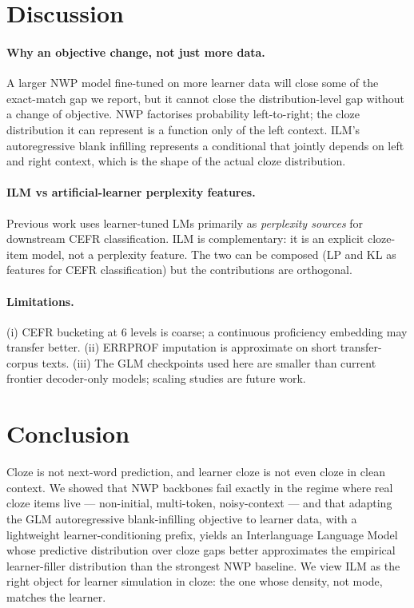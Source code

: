 \documentclass[11pt]{article}
\begin{document}
\section{Discussion}
\label{sec:discussion}

\paragraph{Why an objective change, not just more data.}
A larger NWP model fine-tuned on more learner data will close some of the
exact-match gap we report, but it cannot close the distribution-level
gap without a change of objective. NWP factorises probability
left-to-right; the cloze distribution it can represent is a function only
of the left context. ILM's autoregressive blank infilling represents a
conditional that jointly depends on left and right context, which is the
shape of the actual cloze distribution.

\paragraph{ILM vs artificial-learner perplexity features.}
Previous work uses learner-tuned LMs primarily as \emph{perplexity
sources} for downstream CEFR classification. ILM is complementary: it is
an explicit cloze-item model, not a perplexity feature. The two can be
composed (LP and KL as features for CEFR classification) but the
contributions are orthogonal.

\paragraph{Limitations.}
(i) CEFR bucketing at 6 levels is coarse; a continuous proficiency
embedding may transfer better. (ii) ERRPROF imputation is approximate on
short transfer-corpus texts. (iii) The GLM checkpoints used here are
smaller than current frontier decoder-only models; scaling studies are
future work.

\section{Conclusion}
\label{sec:conclusion}

Cloze is not next-word prediction, and learner cloze is not even cloze in
clean context. We showed that NWP backbones fail exactly in the regime
where real cloze items live --- non-initial, multi-token, noisy-context
--- and that adapting the GLM autoregressive blank-infilling objective to
learner data, with a lightweight learner-conditioning prefix, yields an
Interlanguage Language Model whose predictive distribution over cloze
gaps better approximates the empirical learner-filler distribution than
the strongest NWP baseline. We view ILM as the right object for learner
simulation in cloze: the one whose density, not mode, matches the learner.
\end{document}
